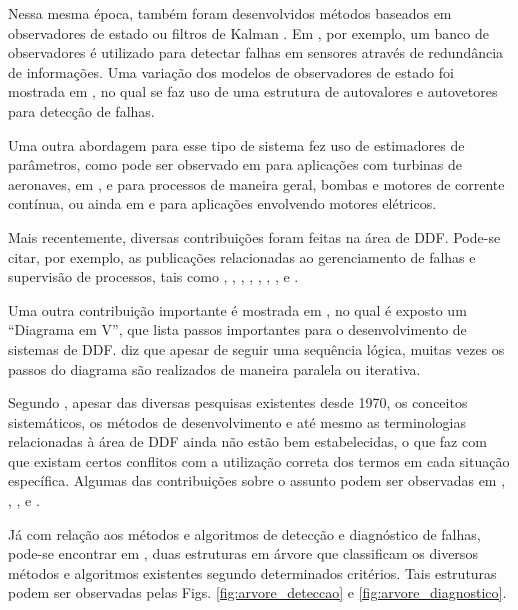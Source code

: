 
Nessa mesma época, também foram desenvolvidos métodos baseados em observadores
de estado ou filtros de Kalman \cite{beard:1971,mehra:1971,jones:1973}. Em
, por exemplo, um banco de observadores é utilizado para
detectar falhas em sensores através de redundância de informações. Uma variação
dos modelos de observadores de estado foi mostrada em ,
no qual se faz uso de uma estrutura de autovalores e autovetores para detecção
de falhas.

Uma outra abordagem para esse tipo de sistema fez uso de estimadores de
parâmetros, como pode ser observado em  para
aplicações com turbinas de aeronaves, em ,
 e  para processos de
maneira geral, bombas e motores de corrente contínua, ou ainda em
 e  para aplicações envolvendo
motores elétricos.

Mais recentemente, diversas contribuições foram feitas na área de DDF. Pode-se
citar, por exemplo, as publicações relacionadas ao gerenciamento de falhas e
supervisão de processos, tais como ,
, , ,
, , ,
 e .

Uma outra contribuição importante é mostrada em , no
qual é exposto um ``Diagrama em V'', que lista passos importantes para o
desenvolvimento de sistemas de DDF.   diz que apesar
de seguir uma sequência lógica, muitas vezes os passos do diagrama são
realizados de maneira paralela ou iterativa.

Segundo , apesar das diversas pesquisas existentes desde
1970, os conceitos sistemáticos, os métodos de desenvolvimento e até mesmo as
terminologias relacionadas à área de DDF ainda não estão bem estabelecidas, o
que faz com que existam certos conflitos com a utilização correta dos termos em
cada situação específica. Algumas das contribuições sobre o assunto podem ser
observadas em , ,
,  e .

Já com relação aos métodos e algoritmos de detecção e diagnóstico de falhas,
pode-se encontrar em , duas estruturas em árvore que
classificam os diversos métodos e al\-go\-rit\-mos existentes segundo
determinados critérios. Tais estruturas podem ser observadas pelas Figs.
\ref{fig:arvore_deteccao} e \ref{fig:arvore_diagnostico}.

